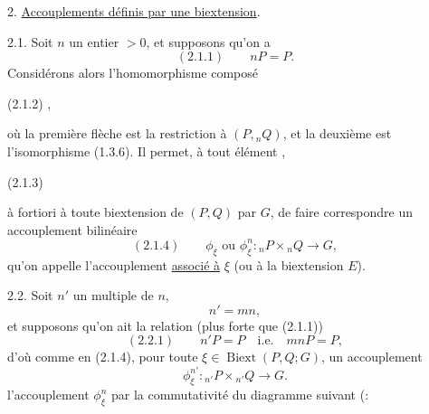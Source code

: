 
2. \uline{Accouplements définis par une biextension}.

2.1. Soit $n$ un entier $>0$, et supposons qu'on a
\[
(2.1.1)\qquad nP=P.
\]
Considérons alors l'homomorphisme composé

(2.1.2)
,

où la première flèche est la restriction à $(P,{}_nQ)$, et la deuxième est l'isomorphisme (1.3.6). Il permet, à tout élément ,

(2.1.3)

à fortiori à toute biextension  de $(P,Q)$ par $G$, de faire correspondre un accouplement bilinéaire
\[
(2.1.4)\qquad\phi_\xi\text{ ou }\phi^n_\xi:{}_nP\times{}_nQ\longrightarrow G,
\]
qu'on appelle l'accouplement \uline{associé à} $\xi$ (ou à la biextension $E$).

2.2. Soit  $n'$ un multiple de $n$,
\[
n'=mn,
\]
et supposons qu'on ait la relation (plus forte que (2.1.1))
\[
(2.2.1)\qquad n'P=P\quad\text{i.e.}\quad mnP=P,
\]
d'où comme en (2.1.4), pour toute $\xi\in\operatorname{Biext}(P,Q;G)$, un accouplement
\[
\phi^{n'}_\xi:{}_{n'}P\times{}_{n'}Q\longrightarrow G.
\]
 l'accouplement $\phi^n_\xi$  par la commutativité du diagramme suivant (:

